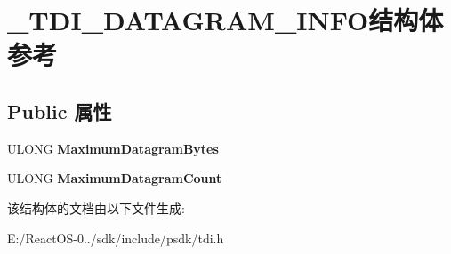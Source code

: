 \hypertarget{struct___t_d_i___d_a_t_a_g_r_a_m___i_n_f_o}{}\section{\+\_\+\+T\+D\+I\+\_\+\+D\+A\+T\+A\+G\+R\+A\+M\+\_\+\+I\+N\+F\+O结构体 参考}
\label{struct___t_d_i___d_a_t_a_g_r_a_m___i_n_f_o}
\subsection*{Public 属性}
\begin{DoxyCompactItemize}
\item 
\mbox{\label{struct___t_d_i___d_a_t_a_g_r_a_m___i_n_f_o_a1f875975510bc3158b5ce1a643ce4bfb}} 
U\+L\+O\+NG {\bfseries Maximum\+Datagram\+Bytes}
\item 
\mbox{\label{struct___t_d_i___d_a_t_a_g_r_a_m___i_n_f_o_a03a1c186a5f346a7ad4b07d110be2df6}} 
U\+L\+O\+NG {\bfseries Maximum\+Datagram\+Count}
\end{DoxyCompactItemize}


该结构体的文档由以下文件生成\+:\begin{DoxyCompactItemize}
\item 
E\+:/\+React\+O\+S-\/0../sdk/include/psdk/tdi.\+h\end{DoxyCompactItemize}
